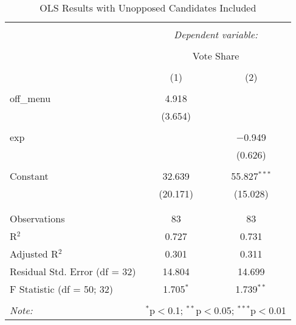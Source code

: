 \begin{table}[H] \centering 
  \caption{OLS Results with Unopposed Candidates Included} 
  \label{} 
\begin{tabular}{@{\extracolsep{5pt}}lcc} 
\\[-1.8ex]\hline 
\hline \\[-1.8ex] 
 & \multicolumn{2}{c}{\textit{Dependent variable:}} \\ 
\cline{2-3} 
\\[-1.8ex] & \multicolumn{2}{c}{Vote Share} \\ 
\\[-1.8ex] & (1) & (2)\\ 
\hline \\[-1.8ex] 
 off\_menu & 4.918 &  \\ 
  & (3.654) &  \\ 
  & & \\ 
 exp &  & $-$0.949 \\ 
  &  & (0.626) \\ 
  & & \\ 
 Constant & 32.639 & 55.827$^{***}$ \\ 
  & (20.171) & (15.028) \\ 
  & & \\ 
\hline \\[-1.8ex] 
Observations & 83 & 83 \\ 
R$^{2}$ & 0.727 & 0.731 \\ 
Adjusted R$^{2}$ & 0.301 & 0.311 \\ 
Residual Std. Error (df = 32) & 14.804 & 14.699 \\ 
F Statistic (df = 50; 32) & 1.705$^{*}$ & 1.739$^{**}$ \\ 
\hline 
\hline \\[-1.8ex] 
\textit{Note:}  & \multicolumn{2}{r}{$^{*}$p$<$0.1; $^{**}$p$<$0.05; $^{***}$p$<$0.01} \\ 
\end{tabular} 
\end{table} 


